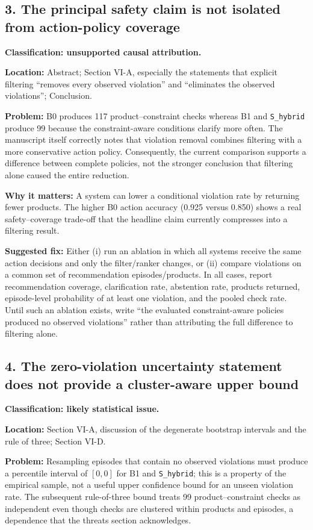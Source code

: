 \documentclass[11pt]{article}
\begin{document}
\subsection*{3. The principal safety claim is not isolated from action-policy coverage}

\textbf{Classification: unsupported causal attribution.}

\textbf{Location:} Abstract; Section VI-A, especially the statements that explicit filtering ``removes every observed violation'' and ``eliminates the observed violations''; Conclusion.

\textbf{Problem:} B0 produces 117 product--constraint checks whereas B1 and \texttt{S\_hybrid} produce 99 because the constraint-aware conditions clarify more often.  The manuscript itself correctly notes that violation removal combines filtering with a more conservative action policy.  Consequently, the current comparison supports a difference between complete policies, not the stronger conclusion that filtering alone caused the entire reduction.

\textbf{Why it matters:} A system can lower a conditional violation rate by returning fewer products.  The higher B0 action accuracy (0.925 versus 0.850) shows a real safety--coverage trade-off that the headline claim currently compresses into a filtering result.

\textbf{Suggested fix:} Either (i) run an ablation in which all systems receive the same action decisions and only the filter/ranker changes, or (ii) compare violations on a common set of recommendation episodes/products.  In all cases, report recommendation coverage, clarification rate, abstention rate, products returned, episode-level probability of at least one violation, and the pooled check rate.  Until such an ablation exists, write ``the evaluated constraint-aware policies produced no observed violations'' rather than attributing the full difference to filtering alone.

\subsection*{4. The zero-violation uncertainty statement does not provide a cluster-aware upper bound}

\textbf{Classification: likely statistical issue.}

\textbf{Location:} Section VI-A, discussion of the degenerate bootstrap intervals and the rule of three; Section VI-D.

\textbf{Problem:} Resampling episodes that contain no observed violations must produce a percentile interval of $[0,0]$ for B1 and \texttt{S\_hybrid}; this is a property of the empirical sample, not a useful upper confidence bound for an unseen violation rate.  The subsequent rule-of-three bound treats 99 product--constraint checks as independent even though checks are clustered within products and episodes, a dependence that the threats section acknowledges.
\end{document}
